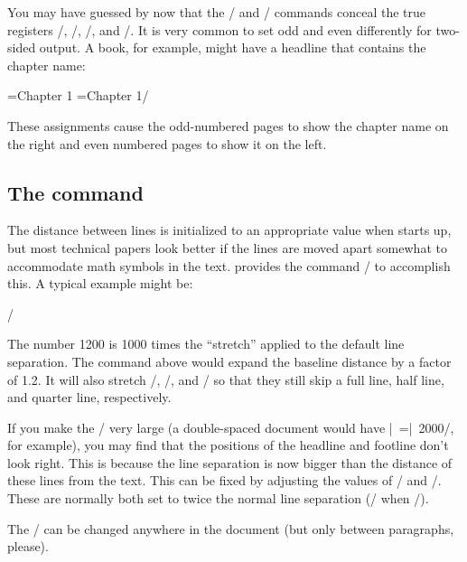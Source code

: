 You may have guessed by now that the \tts\head/ and \tts\foot/ commands conceal
the true registers \tts\oddhead/, \tts\evenhead/, \tts\oddfoot/, and
\tts\evenfoot/.  It is very common to set odd and even differently for
two-sided output.  A book, for example, might have a headline that contains the
chapter name:

\nobreak\smallskip

\tts\oddhead={\hfil Chapter 1} \evenhead={Chapter 1\hfil}/ \par

\smallskip

\noindent These assignments cause the odd-numbered pages to show the chapter
name on the right and even numbered pages to show it on the left.

{\sl\subsection{The\/ {\tt\string\baselinestretch} command}}

The distance between lines is initialized to an appropriate value when \jyTeX{}
starts up, but most technical papers look better if the lines are moved apart
somewhat to accommodate math symbols in the text. \jyTeX{} provides the command
\tts\baselinestretch/ to accomplish this.  A typical example might be:

\nobreak\smallskip

\tts{}/

\smallskip

\noindent The number 1200 is 1000 times the ``stretch'' applied to the default
line separation.  The command above would expand the baseline distance by a
factor of 1.2.  It will also stretch \tts\bigskip/,
\tts\medskip/, and \tts\smallskip/ so that they still skip a full line, half
line, and quarter line, respectively.

If you make the \tts\baselinestretch/ very large (a double-spaced document
would have \tts\baselinestretch|~=|~2000/, for example), you may find that the
positions of the headline and footline don't look right.  This is because the
line separation is now bigger than the distance of these lines from the text.
This can be fixed by adjusting the values of \tts\headskip/ and \tts\footskip/.
These are normally both set to twice the normal line separation (/ when
\tts\typesize=10pt/).

The \tts\baselinestretch/ can be changed anywhere in the document (but only
between paragraphs, please).

